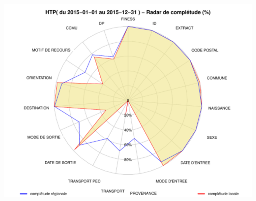 \documentclass[]{article}
\begin{document}
\includegraphics{completude_files/figure-latex/finess-15.pdf}
\end{document}
